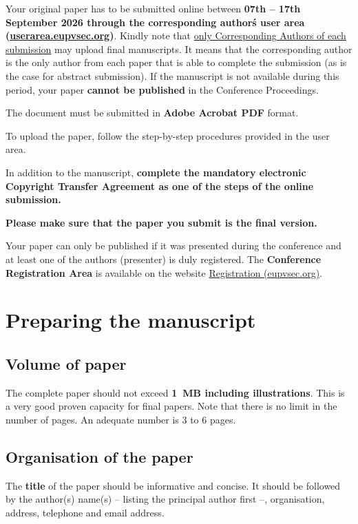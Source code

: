 \documentclass{eupvsec}
\begin{document}
Your original paper has to be submitted online between \textbf{07th --
17th September 2026 through the corresponding author\'s user area
(\href{https://userarea.eupvsec.org}{userarea.eupvsec.org})}. Kindly
note that \underline{only Corresponding Authors of each submission}
may upload final manuscripts. It means that the corresponding author
is the only author from each paper that is able to complete the
submission (as is the case for abstract submission). If the manuscript
is not available during this period, your paper \textbf{cannot be
published} in the Conference Proceedings.

The document must be submitted in \textbf{Adobe Acrobat PDF} format.

To upload the paper, follow the step-by-step procedures provided in
the user area.

In addition to the manuscript, \textbf{complete the mandatory
electronic Copyright Transfer Agreement as one of the steps of the
online submission.}

\textbf{Please make sure that the paper you submit is the final
version.}

Your paper can only be published if it was presented during the
conference and at least one of the authors (presenter) is duly
registered. The \textbf{Conference Registration Area} is available on
the website
\href{https://www.eupvsec.org/index.php/registration}{Registration (eupvsec.org)}.

\section{Preparing the manuscript}

\subsection{Volume of paper}

The complete paper should not exceed \textbf{1~MB including
illustrations}. This is a very good proven capacity for final papers.
Note that there is no limit in the number of pages. An adequate number
is 3 to 6 pages.

\subsection{Organisation of the paper}

The \textbf{title} of the paper should be informative and concise. It
should be followed by the author(s) name(s) -- listing the principal
author first --, organisation, address, telephone and email address.
\end{document}
